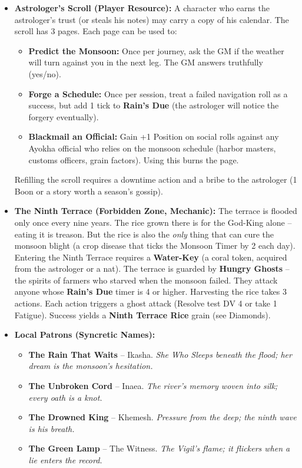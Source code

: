\begin{itemize}
\item \textbf{Astrologer's Scroll (Player Resource):} A character who earns the astrologer's trust (or steals his notes) may carry a copy of his calendar. The scroll has 3 pages. Each page can be used to:
  \begin{itemize}
    \item \textbf{Predict the Monsoon:} Once per journey, ask the GM if the weather will turn against you in the next leg. The GM answers truthfully (yes/no).
    \item \textbf{Forge a Schedule:} Once per session, treat a failed navigation roll as a success, but add 1 tick to \textbf{Rain's Due} (the astrologer will notice the forgery eventually).
    \item \textbf{Blackmail an Official:} Gain +1 Position on social rolls against any Ayokha official who relies on the monsoon schedule (harbor masters, customs officers, grain factors). Using this burns the page.
  \end{itemize}
  Refilling the scroll requires a downtime action and a bribe to the astrologer (1 Boon or a story worth a season's gossip).

\item \textbf{The Ninth Terrace (Forbidden Zone, Mechanic):} The terrace is flooded only once every nine years. The rice grown there is for the God-King alone -- eating it is treason. But the rice is also the \emph{only} thing that can cure the monsoon blight (a crop disease that ticks the Monsoon Timer by 2 each day). Entering the Ninth Terrace requires a \textbf{Water-Key} (a coral token, acquired from the astrologer or a nat). The terrace is guarded by \textbf{Hungry Ghosts} -- the spirits of farmers who starved when the monsoon failed. They attack anyone whose \textbf{Rain's Due} timer is 4 or higher. Harvesting the rice takes 3 actions. Each action triggers a ghost attack (Resolve test DV 4 or take 1 Fatigue). Success yields a \textbf{Ninth Terrace Rice} grain (see Diamonds).

\item \textbf{Local Patrons (Syncretic Names):}
  \begin{itemize}
    \item \textbf{The Rain That Waits} -- Ikasha. \textit{She Who Sleeps beneath the flood; her dream is the monsoon's hesitation.}
    \item \textbf{The Unbroken Cord} -- Inaea. \textit{The river's memory woven into silk; every oath is a knot.}
    \item \textbf{The Drowned King} -- Khemesh. \textit{Pressure from the deep; the ninth wave is his breath.}
    \item \textbf{The Green Lamp} -- The Witness. \textit{The Vigil's flame; it flickers when a lie enters the record.}
  \end{itemize}
\end{itemize}


